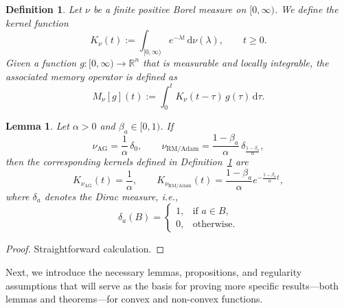 \documentclass{article} %
\newtheorem{definition}{Definition}
\newtheorem{lemma}{Lemma}
\begin{document}
\begin{definition}\label{def:Borel}
Let \(\nu\) be a finite positive Borel measure on \([0,\infty)\). We define the kernel function
\begin{equation}
    K_\nu(t) := \int_{[0,\infty)} e^{-\lambda t} \,\mathrm{d}\nu(\lambda), \qquad t \geq 0.
\end{equation}
Given a function \( g: [0,\infty) \to \mathbb{R}^n \) that is measurable and locally integrable, the associated memory operator is defined as
\begin{equation}
    M_{\nu}[g](t) := \int_0^t K_\nu(t - \tau) \, g(\tau) \,\mathrm{d}\tau.
\end{equation}
\end{definition}
\begin{lemma}\label{lemma:kernels}
Let \( \alpha > 0 \) and \( \beta_a \in [0,1) \). If
\begin{equation}
    \nu_{\mathrm{AG}} = \frac{1}{\alpha} \, \delta_0, 
    \qquad 
    \nu_{\mathrm{RM/Adam}} = \frac{1-\beta_a}{\alpha} \, \delta_{\frac{1-\beta_a}{\alpha}},
\end{equation}
then the corresponding kernels defined in Definition~\ref{def:Borel} are
\begin{equation}
    K_{\nu_{\mathrm{AG}}}(t) = \frac{1}{\alpha}, 
    \qquad 
    K_{\nu_{\mathrm{RM/Adam}}}(t) = \frac{1-\beta_a}{\alpha} e^{-\frac{1-\beta_a}{\alpha} t},
\end{equation}
where \( \delta_a \) denotes the Dirac measure, i.e.,
\begin{equation}
    \delta_a(B) = 
    \begin{cases}
        1, & \text{if } a \in B, \\
        0, & \text{otherwise}.
    \end{cases}
\end{equation}
\end{lemma}

\begin{proof}
    Straightforward calculation.
\end{proof}

Next, we introduce the necessary lemmas, propositions, and regularity assumptions that will serve as the basis for proving more specific results---both lemmas and theorems---for convex and non-convex functions.
\end{document}
